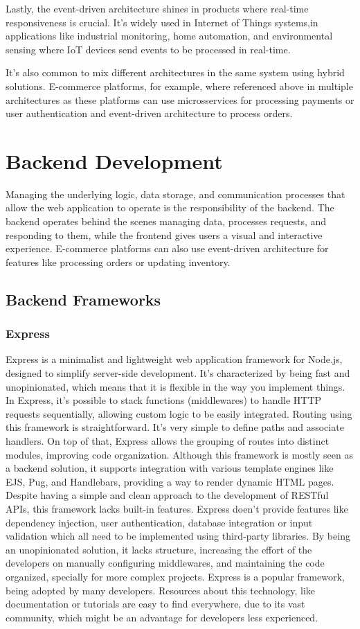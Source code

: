 Lastly, the event-driven architecture shines in products where real-time
responsiveness is crucial. It's widely used in Internet of Things systems,in
applications like industrial monitoring, home automation, and environmental
sensing where IoT devices send events to be processed in real-time.

It's also common to mix different architectures in the same system using
hybrid solutions. E-commerce platforms, for example, where referenced above in
multiple architectures as these platforms can use microsservices for processing
payments or user authentication and event-driven architecture to process orders.

\section{Backend Development}
Managing the underlying logic, data storage, and communication processes that
allow the web application to operate is the responsibility of the backend.
The backend operates behind the scenes managing data, processes requests, and
responding to them, while the frontend gives users a visual and interactive
experience. E-commerce platforms can also use event-driven architecture for
features like processing orders or updating inventory.

\subsection{Backend Frameworks}
\subsubsection{Express}
Express is a minimalist and lightweight web application framework for Node.js,
designed to simplify server-side development. It's characterized by being
fast and unopinionated, which means that it is flexible in the way you implement
things.
In Express, it's possible to stack functions (middlewares) to handle \gls{HTTP}
requests sequentially, allowing custom logic to be easily integrated.
Routing using this framework is straightforward. It's very simple to define
paths and associate handlers. On top of that, Express allows the grouping of
routes into distinct modules, improving code organization.
Although this framework is mostly seen as a backend solution, it supports
integration with various template engines like EJS, Pug, and Handlebars,
providing a way to render dynamic HTML pages.
Despite having a simple and clean approach to the development of RESTful APIs,
this framework lacks built-in features. Express doen't provide features like
dependency injection, user authentication, database integration or input
validation which all need to be implemented using third-party libraries.
By being an unopinionated solution, it lacks structure, increasing the effort
of the developers on manually configuring middlewares, and maintaining the code
organized, specially for more complex projects.
Express is a popular framework, being adopted by many developers. Resources
about this technology, like documentation or tutorials are easy to find
everywhere, due to its vast community, which might be an advantage for
developers less experienced.

